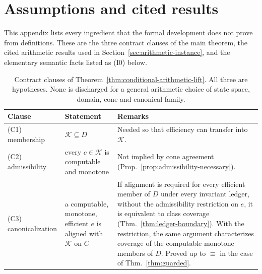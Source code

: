 \section{Assumptions and cited results}\label{app:contract-imports}

This appendix lists every ingredient that the formal development does not prove from definitions. These are the three contract clauses of the main theorem, the cited arithmetic results used in Section~\ref{sec:arithmetic-instance}, and the elementary semantic facts listed as (I0) below.

\begin{table}[ht]
\caption{Contract clauses of Theorem~\ref{thm:conditional-arithmetic-lift}. All three are hypotheses. None is discharged for a general arithmetic choice of state space, domain, cone and canonical family.}
\label{tab:contract}
\centering
\small
\begin{tabularx}{\textwidth}{@{}l X X@{}}
\toprule
Clause & Statement & Remarks \\
\midrule
(C1) membership & $\mathcal{K}\subseteq D$ & Needed so that efficiency can transfer into $\mathcal{K}$. \\[3pt]
(C2) admissibility & every $c\in\mathcal{K}$ is computable and monotone & Not implied by cone agreement (Prop.~\ref{prop:admissibility-necessary}). \\[3pt]
(C3) canonicalization & a computable, monotone, efficient $e$ is aligned with $\mathcal{K}$ on $C$ & If alignment is required for every efficient member of $D$ under every invariant ledger, without the admissibility restriction on $e$, it is equivalent to class coverage (Thm.~\ref{thm:ledger-boundary}). With the restriction, the same argument characterizes coverage of the computable monotone members of $D$. Proved up to $\equiv$ in the case of Thm.~\ref{thm:guarded}. \\
\bottomrule
\end{tabularx}
\end{table}

